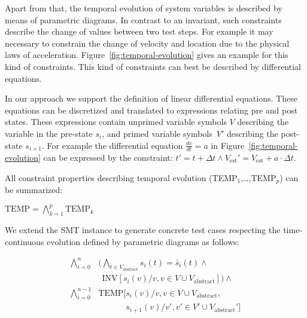 Apart from that, the temporal evolution of system variables is described by means of parametric diagrams. 
In contrast to an invariant, such constraints describe the change of values between two test steps. For example it may necessary to constrain the change of velocity
and location due to the physical laws of acceleration.
Figure~\ref{fig:temporal-evolution} gives an example for this kind of
constraints. This kind of constraints can best be described by differential equations.

In our approach we support the definition of linear differential equations.
These equations can be discretized and translated to expressions relating pre
and post states. These expressions contain unprimed variable symbols $V$ describing
the variable in the pre-state $s_i$, and primed variable symbols~$V'$ describing the
post-state $s_{i+1}$.
For example the differential equation $\frac{d v}{d t}=a$ in
Figure~\ref{fig:temporal-evolution} can be expressed by the constraint:
$t'=t+\Delta t \land 
{V_\text{est}}'={V_\text{est}}+{a}\cdot\Delta t$.

All constraint properties describing temporal evolution
(TEMP$_1$,\ldots,TEMP$_p$) can be summarized:

$\text{TEMP}=\bigwedge_{k=1}^{p}\text{TEMP}_k$

We extend the SMT instance to generate concrete test cases respecting  the
time-continuous evolution defined by parametric diagrams as follows:


\begin{align}
\bigwedge_{i=0}^{n}& \big(\bigwedge_{t\in V_\text{abstract}} s_i(t) =\bar{s}_i(t) \wedge {}\\
& \ \ 
\text{INV}[s_i(v)/v, v\in V\cup V_\text{abstract}]\big) \wedge  {}  \\
\bigwedge_{i=0}^{n-1} & \text{TEMP}[s_i(v)/v, v \in V\cup V_\text{abstract}, \\
&
\phantom{\text{TEMP}[}
s_{i+1}(v)/v', v'\in V'\cup V_\text{abstract}']
\end{align}



